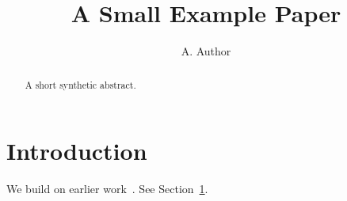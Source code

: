 \documentclass{article}
\title{A Small Example Paper}
\author{A. Author}
\begin{document}
\maketitle
\begin{abstract}
A short synthetic abstract.
\end{abstract}
\section{Introduction}\label{sec:intro}
We build on earlier work~\cite{alpha2020}. See Section~\ref{sec:intro}.


\end{document}
